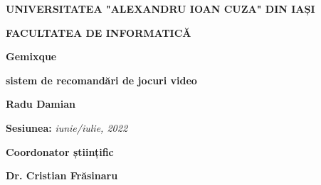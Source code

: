 \documentclass[12pt,a4paper]{report}
\begin{document}

\begin{titlepage}
	\centering
	{\scshape\large \textbf{UNIVERSITATEA "ALEXANDRU IOAN CUZA" DIN IAȘI} \par}
	\vspace{0.5cm}
	{\scshape\Large \textbf{FACULTATEA DE INFORMATICĂ}\par}
	\vspace{5cm}


	{\huge\bfseries Gemixque\par}
	\vspace{1cm}
	{\normalsize \textbf{sistem de recomandări de jocuri video}\par}
	\vspace{3cm}
	{\Large\textbf {Radu Damian}\par}
	\vspace{2cm}
	{\normalsize \textbf{Sesiunea:} \textit{iunie/iulie, 2022}\par}
	\vspace{4cm}
	{\normalsize \textbf{Coordonator științific}\par}
	\vspace{0.5cm}
	{\Large\textbf {Dr. Cristian Frăsinaru}\par}
\end{titlepage}
\end{document}
